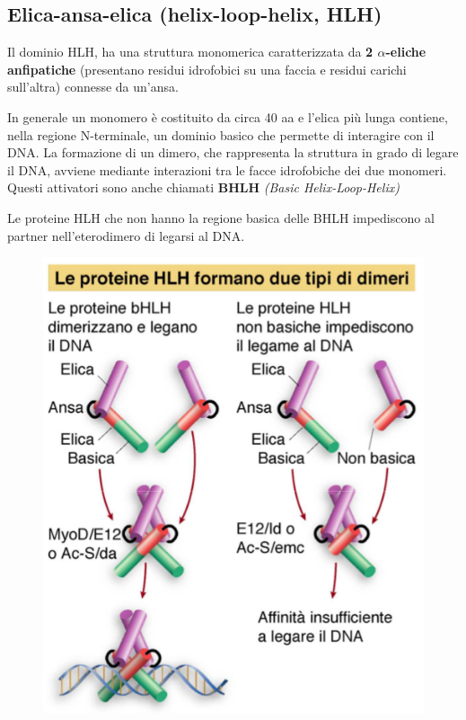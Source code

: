 \documentclass[11pt]{book}
\begin{document}
\subsection{Elica-ansa-elica (helix-loop-helix,
HLH)}\label{elica-ansa-elica-helix-loop-helix-hlh}

Il dominio HLH, ha una struttura monomerica caratterizzata da \textbf{2
\(\alpha\)-eliche anfipatiche} (presentano residui idrofobici su una
faccia e residui carichi sull'altra) connesse da un'ansa.

In generale un monomero è costituito da circa 40 aa e l'elica più lunga
contiene, nella regione N-terminale, un dominio basico che permette di
interagire con il DNA. La formazione di un dimero, che rappresenta la
struttura in grado di legare il DNA, avviene mediante interazioni tra le
facce idrofobiche dei due monomeri. Questi attivatori sono anche
chiamati \textbf{BHLH} \emph{(Basic Helix-Loop-Helix)}

Le proteine HLH che non hanno la regione basica delle BHLH impediscono
al partner nell'eterodimero di legarsi al DNA.

\begin{figure}[htp]
\centering
\includegraphics[scale=1.00]{img/43_HLH.png}
\caption{}
\label{hlh}
\end{figure}
\end{document}
